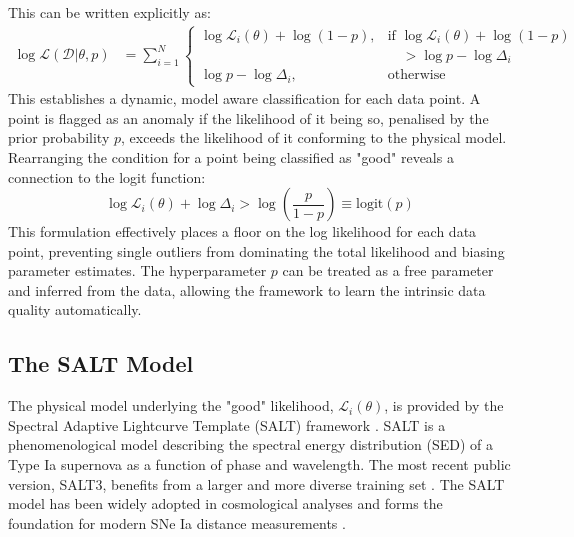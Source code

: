 This can be written explicitly as:
\begin{equation}
\begin{split}
    \log \mathcal{L}(\mathcal{D}|\theta, p) &= \sum_{i=1}^{N} \begin{cases}
        \log\mathcal{L}_i(\theta) + \log(1-p), & \text{if } \log\mathcal{L}_i(\theta) + \log(1-p) \\
        & \quad > \log p - \log\Delta_i \\
        \log p - \log\Delta_i, & \text{otherwise}
    \end{cases}
\end{split}
\end{equation}
This establishes a dynamic, model aware classification for each data point. A point is flagged as an anomaly if the likelihood of it being so, penalised by the prior probability $p$, exceeds the likelihood of it conforming to the physical model. Rearranging the condition for a point being classified as "good" reveals a connection to the logit function:
\begin{equation}
    \log\mathcal{L}_i(\theta) + \log\Delta_i > \log\left(\frac{p}{1-p}\right) \equiv \mathrm{logit}(p)
\end{equation}
This formulation effectively places a floor on the log likelihood for each data point, preventing single outliers from dominating the total likelihood and biasing parameter estimates. The hyperparameter $p$ can be treated as a free parameter and inferred from the data, allowing the framework to learn the intrinsic data quality automatically.

\subsection{The SALT Model}
\label{subsec:salt_model}

The physical model underlying the "good" likelihood, $\mathcal{L}_i(\theta)$, is provided by the Spectral Adaptive Lightcurve Template (SALT) framework \citep{Guy2005, Guy2007}. SALT is a phenomenological model describing the spectral energy distribution (SED) of a Type Ia supernova as a function of phase and wavelength. The most recent public version, SALT3, benefits from a larger and more diverse training set \citep{Kenworthy2021}. The SALT model has been widely adopted in cosmological analyses and forms the foundation for modern SNe Ia distance measurements \citep{Scolnic2022, Hayes2024}.

